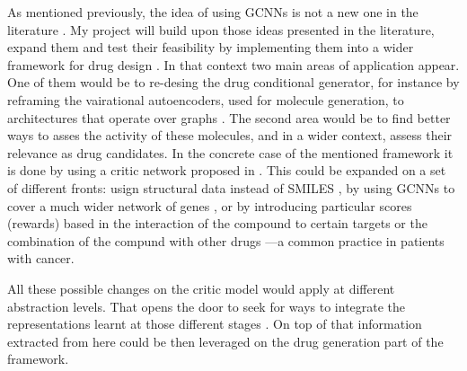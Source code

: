\documentclass{article}
\begin{document}
As mentioned previously, the idea of using GCNNs is not a new one in the literature
\cite{Sun2019}. My project will build upon those ideas presented in the literature,
expand them and test their feasibility by implementing them into a wider framework for
drug design \cite{Born2019}. In that context two main areas of application appear. One
of them would be to re-desing the drug conditional generator, for instance by reframing
the vairational autoencoders, used for molecule generation, to architectures that
operate over graphs \cite{Simonovsky2018,Li2018,Li2018a}. The second area would be to
find better ways to asses the activity of these molecules, and in a wider context,
assess their relevance as drug candidates. In the concrete case of the mentioned
framework it is done by using a critic network proposed in \cite{Manica2019}. This could
be expanded on a set of different fronts: usign structural data instead of SMILES
\cite{Li,Do2019}, by using GCNNs to cover a much wider network of genes
\cite{Oskooei2019, Wang2019}, or by introducing particular scores (rewards) based in the
interaction of the compound to certain targets \cite{YingkaiGao2018, Zhavoronkov2019} or
the combination of the compund with other drugs \cite{Zitnik2018} ---a common practice
in patients with cancer.

All these possible changes on the critic model would apply at different abstraction
levels. That opens the door to seek for ways to integrate the representations learnt at
those different stages \cite{Ying2018, Ma2019, Huang2019}. On top of that information
extracted from here could be then leveraged on the drug generation part of the
framework.









    
\end{document}

